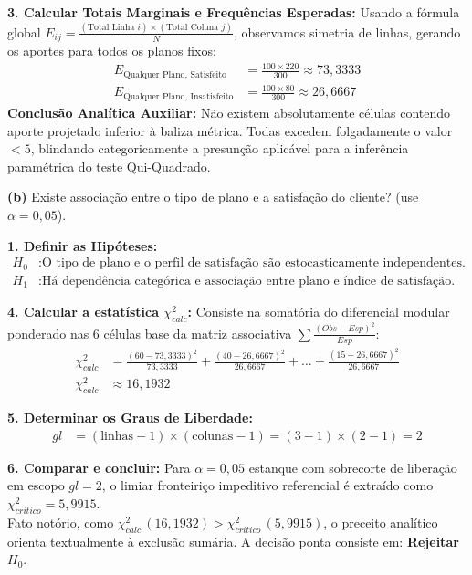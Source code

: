 \documentclass[12pt, a4paper]{article}
\begin{document}
\noindent \textbf{3. Calcular Totais Marginais e Frequências Esperadas:} Usando a fórmula global $E_{ij} = \frac{(\text{Total Linha } i) \times (\text{Total Coluna } j)}{N}$, observamos simetria de linhas, gerando os aportes para todos os planos fixos:
\begin{align*}
E_{\text{Qualquer Plano, Satisfeito}} &= \frac{100 \times 220}{300} \approx \boxed{73{,}3333} \\
E_{\text{Qualquer Plano, Insatisfeito}} &= \frac{100 \times 80}{300} \approx \boxed{26{,}6667}
\end{align*}
\textbf{Conclusão Analítica Auxiliar:} Não existem absolutamente células contendo aporte projetado inferior à baliza métrica. Todas excedem folgadamente o valor $< 5$, blindando categoricamente a presunção aplicável para a inferência paramétrica do teste Qui-Quadrado.

\medskip\noindent\textbf{(b)} Existe associação entre o tipo de plano e a satisfação do cliente? (use $\alpha = 0{,}05$).

\noindent \textbf{1. Definir as Hipóteses:}
\begin{align*}
H_0 &: \text{O tipo de plano e o perfil de satisfação são estocasticamente independentes.} \\
H_1 &: \text{Há dependência categórica e associação entre plano e índice de satisfação.}
\end{align*}

\noindent \textbf{4. Calcular a estatística $\chi^2_{calc}$:}
Consiste na somatória do diferencial modular ponderado nas 6 células base da matriz associativa $\sum \frac{(Obs - Esp)^2}{Esp}$:
\begin{align*}
\chi^2_{calc} &= \frac{(60 - 73{,}3333)^2}{73{,}3333} + \frac{(40 - 26{,}6667)^2}{26{,}6667} + \dots + \frac{(15 - 26{,}6667)^2}{26{,}6667} \\
\chi^2_{calc} &\approx \boxed{16{,}1932}
\end{align*}

\noindent \textbf{5. Determinar os Graus de Liberdade:}
\begin{align*}
gl &= (\text{linhas} - 1) \times (\text{colunas} - 1) = (3 - 1) \times (2 - 1) = \boxed{2}
\end{align*}

\noindent \textbf{6. Comparar e concluir:}
Para $\alpha = 0{,}05$ estanque com sobrecorte de liberação em escopo $gl = 2$, o limiar fronteiriço impeditivo referencial é extraído como $\chi^2_{critico} = \boxed{5{,}9915}$. \\
Fato notório, como $\chi^2_{calc} \, (16{,}1932) > \chi^2_{critico} \, (5{,}9915)$, o preceito analítico orienta textualmente à exclusão sumária. A decisão ponta consiste em: \textbf{Rejeitar $H_0$}.
\end{document}
